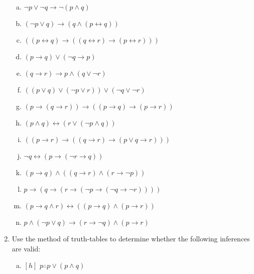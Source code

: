 \begin{enumerate}[\thesection.1]
\begin{enumerate}[(a)]
				\item $\neg p\lor\neg q\rightarrow\neg(p \land q)$

				\item $(\neg p \lor q) \rightarrow (q \land (p \leftrightarrow q))$
				
				\item $((p \leftrightarrow q) \to ((q \leftrightarrow r) \to(p \leftrightarrow r)))$

				\item $(p \rightarrow q) \lor (\neg q \rightarrow p)$
				
				\item $(q \to r) \to p \land (q \lor \neg r)$

				
				\item $((p \lor q) \lor (\neg p \lor r)) \lor (\neg q \lor \neg r) $ 

				\item $(p \to (q \to r)) \to ((p \to q) \to (p \to r))$

				\item $(p \land q) \leftrightarrow (r \lor (\neg p \land q))$ 

				\item $((p \to r) \to ((q \to r) \to (p \lor q \to r)))$

				\item $\neg q \leftrightarrow (p \to (\neg r \to q))$

				\item $(p \to q) \land ((q \to r) \land (r \to \neg p))$ 

				\item $p \to (q \to (r \to (\neg p \to (\neg q \to \neg r))))$

				\item $(p \rightarrow q \land r) \leftrightarrow ((p \rightarrow q) \land (p \rightarrow r))$

				\item $p \land (\neg p \lor q) \to (r \to \neg q) \land (p \to r)$

			

			\end{enumerate}
			\item Use the method of truth-tables to determine whether the following inferences are valid:
			
				\begin{enumerate}[(a)]
									
									
					\item $[h]$ $p\therefore p\lor (p\land q)$ 


\end{enumerate}
\end{enumerate}
